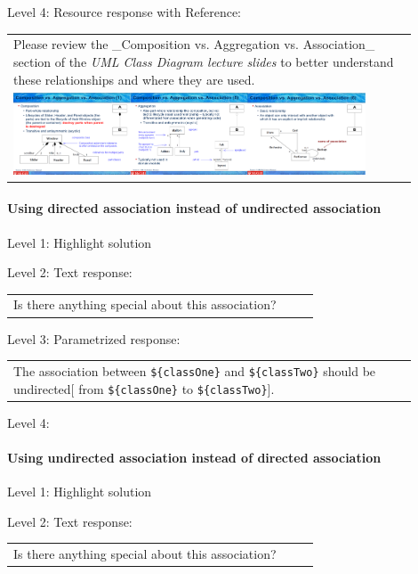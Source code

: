 \noindent Level 4: Resource response with Reference: \medskip

\begin{tabular}{|p{0.9\linewidth}}
Please review the _Composition vs. Aggregation vs. Association_ section of 
the \textit{UML Class Diagram lecture slides} to 
better understand these relationships and where they are used.

\\
\includegraphics[width=0.9\textwidth]{images/composition_aggregation_association.png}
\end{tabular} \medskip


\paragraph{Using directed association instead of undirected association}

\noindent Level 1: Highlight solution \medskip

\noindent Level 2: Text response: \medskip

\begin{tabular}{|p{0.9\linewidth}}
Is there anything special about this association?
\end{tabular} \medskip

\noindent Level 3: Parametrized response: \medskip

\begin{tabular}{|p{0.9\linewidth}}
The association between \verb|${classOne}| and \verb|${classTwo}| should be undirected[ from \verb|${classOne}| to \verb|${classTwo}|].
\end{tabular} \medskip

\noindent Level 4: 
\paragraph{Using undirected association instead of directed association}

\noindent Level 1: Highlight solution \medskip

\noindent Level 2: Text response: \medskip

\begin{tabular}{|p{0.9\linewidth}}
Is there anything special about this association?
\end{tabular} \medskip

